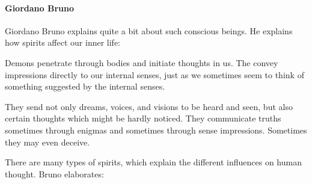 \paragraph{Giordano Bruno}
Giordano Bruno explains quite a bit about such conscious beings. He explains how spirits affect our inner life:

\begin{quotex}
Demons penetrate through bodies and initiate thoughts in us. The convey impressions directly to our internal senses, just as we sometimes seem to think of something suggested by the internal senses.

They send not only dreams, voices, and visions to be heard and seen, but also certain thoughts which might be hardly noticed. They communicate truths sometimes through enigmas and sometimes through sense impressions. Sometimes they may even deceive.

\end{quotex}
There are many types of spirits, which explain the different influences on human thought. Bruno elaborates:

